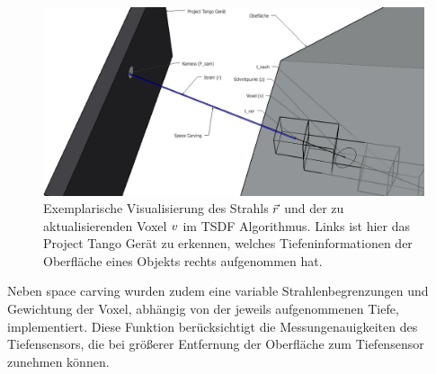 \begin{figure}[h]
  \centering
	\includegraphics[width=1.0\textwidth]{content/images/methods/tsdf-sketch.png} 
  \caption{Exemplarische Visualisierung des Strahls $\protect\vec{r}$ und der zu aktualisierenden Voxel $\protect v$ im TSDF Algorithmus. Links ist hier das Project Tango Gerät zu erkennen, welches Tiefeninformationen der Oberfläche eines Objekts rechts aufgenommen hat.}
  \label{fig:tsdf-sketch}
\end{figure}

Neben space carving wurden zudem eine variable Strahlenbegrenzungen und Gewichtung der Voxel, abhängig von der jeweils aufgenommenen Tiefe, implementiert. Diese Funktion berücksichtigt die Messungenauigkeiten des Tiefensensors, die bei größerer Entfernung der Oberfläche zum Tiefensensor zunehmen können. \citep{Klingensmith_2015_7924}
